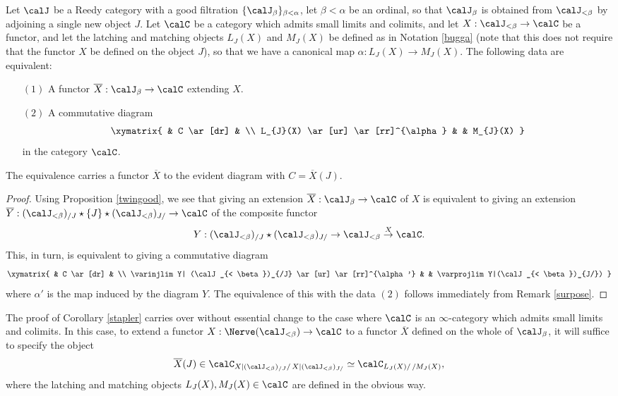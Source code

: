 \begin{corollary}\label{stapler}
Let $\calJ$ be a Reedy category with a good filtration $\{ \calJ_{\beta} \}_{\beta < \alpha}$,
let $\beta < \alpha$ be an ordinal, so that $\calJ_{\beta}$ is obtained from
$\calJ_{< \beta}$ by adjoining a single new object $J$. Let
$\calC$ be a category which admits small limits and colimits, and let
$X: \calJ_{< \beta} \rightarrow \calC$ be a functor, and let the latching and matching
objects $L_J(X)$ and $M_{J}(X)$ be defined as in Notation \ref{bugga}
(note that this does not require that the functor $X$ be defined on the object $J$), so that we have a canonical map $\alpha: L_{J}(X) \rightarrow M_{J}(X)$. The following data are equivalent:
\begin{itemize}
\item[$(1)$] A functor $\overline{X}: \calJ_{\beta} \rightarrow \calC$ extending $X$.
\item[$(2)$] A commutative diagram
$$ \xymatrix{ & C \ar[dr] & \\
L_{J}(X) \ar[ur] \ar[rr]^{\alpha} & & M_{J}(X) }$$
in the category $\calC$.
\end{itemize}
The equivalence carries a functor $\overline{X}$ to the evident diagram with
$C = \overline{X}(J)$.
\end{corollary}

\begin{proof}
Using Proposition \ref{twingood}, we see that giving an extension $\overline{X}: \calJ_{\beta} \rightarrow \calC$ of $X$ is equivalent to giving an extension $\overline{Y}: ( \calJ_{< \beta})_{/J} \star \{J\} \star ( \calJ_{< \beta})_{J/} \rightarrow \calC$ of the composite functor
$$Y: (\calJ_{< \beta})_{/J} \star (\calJ_{< \beta})_{J/} \rightarrow \calJ_{< \beta} \stackrel{X}{\rightarrow} \calC.$$
This, in turn, is equivalent to giving a commutative diagram
$$ \xymatrix{ & C \ar[dr] & \\
\varinjlim Y| (\calJ_{< \beta})_{/J} \ar[ur] \ar[rr]^{\alpha'} & & \varprojlim Y|(\calJ_{< \beta})_{J/}) }$$
where $\alpha'$ is the map induced by the diagram $Y$. The equivalence of this with the
data $(2)$ follows immediately from Remark \ref{surpose}.
\end{proof}

\begin{remark}\label{stapler2}
The proof of Corollary \ref{stapler} carries over without essential change to the case where
$\calC$ is an $\infty$-category which admits small limits and colimits. In this case, to
extend a functor $X: \Nerve( \calJ_{< \beta}) \rightarrow \calC$ to a functor $\overline{X}$ defined on the whole of $\calJ_{\beta}$, it will suffice to specify the object
$$ \overline{X}(J) \in \calC_{ X | (\calJ_{< \beta})_{/J} / \, X | (\calJ_{< \beta})_{J/}}
\simeq \calC_{ L_{J}(X) / \, / M_J(X) },$$
where the latching and matching objects $L_J(X), M_J(X) \in \calC$ are defined in the obvious way.
\end{remark}

